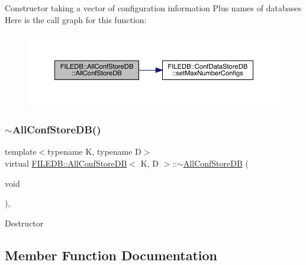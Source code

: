 Constructor taking a vector of configuration information Plus names of databases Here is the call graph for this function\+:
\nopagebreak
\begin{figure}[H]
\begin{center}
\leavevmode
\includegraphics[width=350pt]{df/db6/classFILEDB_1_1AllConfStoreDB_ab8b213578395f0ac7d436a82f4a26fe1_cgraph}
\end{center}
\end{figure}
\mbox{\label{classFILEDB_1_1AllConfStoreDB_ac5fe65eab60f20d7b8124c69c0bd5923}} 
\subsubsection{\texorpdfstring{$\sim$AllConfStoreDB()}{~AllConfStoreDB()}\hspace{0.1cm}{\footnotesize\ttfamily [2/2]}}
{\footnotesize\ttfamily template$<$typename K, typename D$>$ \\
virtual \mbox{\hyperlink{classFILEDB_1_1AllConfStoreDB}{F\+I\+L\+E\+D\+B\+::\+All\+Conf\+Store\+DB}}$<$ K, D $>$\+::$\sim$\mbox{\hyperlink{classFILEDB_1_1AllConfStoreDB}{All\+Conf\+Store\+DB}} (\begin{DoxyParamCaption}\item[{void}]{ }\end{DoxyParamCaption})\hspace{0.3cm}{\ttfamily [inline]}, {\ttfamily [virtual]}}

Destructor 

\subsection{Member Function Documentation}
\mbox{\label{classFILEDB_1_1AllConfStoreDB_a7bb7f812d80471897860af5692eb5bd2}} 
